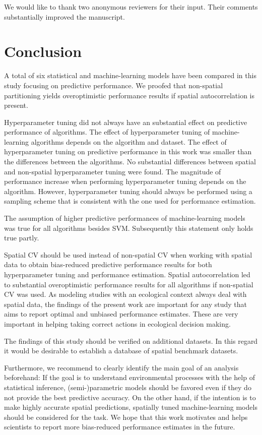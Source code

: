 \documentclass[review]{elsarticle}
\begin{document}
We would like to thank two anonymous reviewers for their input. 
Their comments substantially improved the manuscript.

\section{Conclusion}
 
\noindent A total of six statistical and machine-learning models have been compared in this study focusing on predictive performance.
We proofed that non-spatial partitioning yields overoptimistic performance results if spatial autocorrelation is present.

Hyperparameter tuning did not always have an substantial effect on predictive performance of algorithms.
The effect of hyperparameter tuning of machine-learning algorithms depends on the algorithm and dataset.
The effect of hyperparameter tuning on predictive performance in this work was smaller than the differences between the algorithms.
No substantial differences between spatial and non-spatial hyperparameter tuning were found.
The magnitude of performance increase when performing hyperparameter tuning depends on the algorithm.
However, hyperparameter tuning should always be performed using a sampling scheme that is consistent with the one used for performance estimation.

The assumption of higher predictive performances of machine-learning models was true for all algorithms besides SVM.
Subsequently this statement only holds true partly.

Spatial \ac{CV} should be used instead of non-spatial \ac{CV} when working with spatial data to obtain bias-reduced predictive performance results for both hyperparameter tuning and performance estimation.
Spatial autocorrelation led to substantial overoptimistic performance results for all algorithms if non-spatial CV was used.
As modeling studies with an ecological context always deal with spatial data, the findings of the present work are important for any study that aims to report optimal and unbiased performance estimates.
These are very important in helping taking correct actions in ecological decision making.

The findings of this study should be verified on additional datasets. 
In this regard it would be desirable to establish a database of spatial benchmark datasets.

Furthermore, we recommend to clearly identify the main goal of an analysis beforehand:
If the goal is to understand environmental processes with the help of statistical inference, (semi-)parametric models should be favored even if they do not provide the best predictive accuracy.
On the other hand, if the intention is to make highly accurate spatial predictions, spatially tuned machine-learning models should be considered for the task.
We hope that this work motivates and helps scientists to report more bias-reduced performance estimates in the future.
\end{document}
